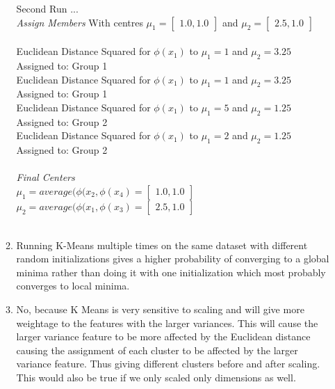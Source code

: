 \documentclass[12pt,letterpaper]{article}
\begin{document}
\begin{enumerate}
\begin{enumerate}
                    Second Run ... \\
                    \textit{Assign Members}
                    With centres  $\mu_{1} =  \begin{bmatrix}1.0, 1.0\end{bmatrix}$  and $\mu_{2} = \begin{bmatrix}2.5, 1.0\end{bmatrix}$ \\ \\
                    Euclidean Distance Squared for $\phi (x_{1})$ to $\mu_{1} = 1 $ and $\mu_{2} = 3.25$ \\
                    Assigned to: Group 1 \\
                    Euclidean Distance Squared for $\phi (x_{1})$ to $\mu_{1} = 1 $ and $\mu_{2} = 3.25$ \\
                    Assigned to: Group 1 \\
                    Euclidean Distance Squared for $\phi (x_{1})$ to $\mu_{1} = 5 $ and $\mu_{2} = 1.25$ \\
                    Assigned to: Group 2 \\
                    Euclidean Distance Squared for $\phi (x_{1})$ to $\mu_{1} = 2 $ and $\mu_{2} = 1.25$ \\
                    Assigned to: Group 2 \\ \\
                    \textit{Final Centers} \\
                    $\mu_{1} = average(\phi (x_{2}, \phi (x_{4}) =  \begin{bmatrix} 1.0, 1.0 \end{bmatrix} $ \\
                    $\mu_{2} = average(\phi (x_{1}, \phi (x_{3}) =  \begin{bmatrix} 2.5, 1.0 \end{bmatrix}$ \\ \\
                    
                    
                    \item Running K-Means multiple times on the same dataset with different random initializations gives a higher probability of converging to a global minima rather than doing it with one initialization which most probably converges to local minima.

                    \item No, because K Means is very sensitive to scaling and will give more weightage to the features with the larger variances. This will cause the larger variance feature to be more affected by the Euclidean distance causing the assignment of each cluster to be affected by the larger variance feature. Thus giving different clusters before and after scaling. This would also be true if we only scaled only dimensions as well.
                \end{enumerate}
             
    \end{enumerate}
\end{document}
